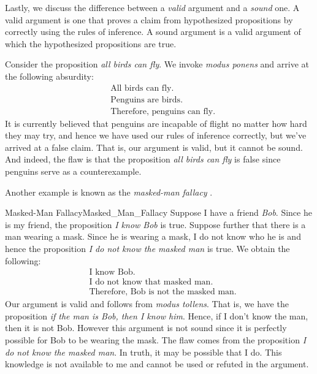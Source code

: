         Lastly, we discuss the difference between a \textit{valid} argument and
        a \textit{sound} one. A valid argument is one that proves a claim from
        hypothesized propositions by correctly using the rules of inference. A
        sound argument is a valid argument of which the hypothesized
        propositions are true.
        \begin{example}
            Consider the proposition \textit{all birds can fly}. We invoke
            \textit{modus ponens} and arrive at the following absurdity:
            \begin{subequations}
                \begin{align}
                    &\text{All birds can fly}.\\
                    &\text{Penguins are birds}.\\
                    &\text{Therefore, penguins can fly}.
                \end{align}
            \end{subequations}
            It is currently believed that penguins are incapable of flight no
            matter how hard they may try, and hence we have used our rules of
            inference correctly, but we've arrived at a false claim. That is,
            our argument is valid, but it cannot be sound. And indeed, the flaw
            is that the proposition \textit{all birds can fly} is false since
            penguins serve as a counterexample.
        \end{example}
        Another example is known as the \textit{masked-man fallacy}%
        .
        \begin{lexample}{Masked-Man Fallacy}{Masked_Man_Fallacy}
            Suppose I have a friend \textit{Bob}. Since he is my friend, the
            proposition \textit{I know Bob} is true. Suppose further that there
            is a man wearing a mask. Since he is wearing a mask, I do not know
            who he is and hence the proposition
            \textit{I do not know the masked man} is true. We obtain the
            following:
            \begin{subequations}
                \begin{align}
                    &\text{I know Bob}.\\
                    &\text{I do not know that masked man}.\\
                    &\text{Therefore, Bob is not the masked man}.
                \end{align}
            \end{subequations}
            Our argument is valid and follows from \textit{modus tollens}. That
            is, we have the proposition
            \textit{if the man is Bob, then I know him}. Hence, if I don't know
            the man, then it is not Bob. However this argument is not sound
            since it is perfectly possible for Bob to be wearing the mask. The
            flaw comes from the proposition
            \textit{I do not know the masked man}. In truth, it may be possible
            that I do. This knowledge is not available to me and cannot be used
            or refuted in the argument.
        \end{lexample}